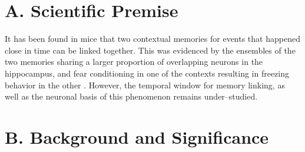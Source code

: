 \documentclass[master.tex]{subfiles}
\begin{document}
\section*{A. Scientific Premise}

It has been found in mice that two contextual memories for events that happened
close in time can be linked together. This was evidenced by the ensembles of the
two memories sharing a larger proportion of overlapping neurons in the
hippocampus, and fear conditioning in one of the contexts resulting in freezing
behavior in the other \cite{cai_shared_2016}. However, the temporal window for
memory linking, as well as the neuronal basis of this phenomenon remains
under--studied.


\section*{B. Background and Significance}
\end{document}
